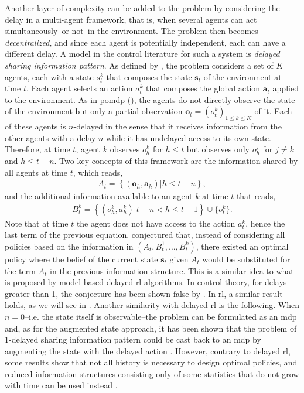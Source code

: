 Another layer of complexity can be added to the problem by considering the delay in a multi-agent framework, that is, when several agents can act simultaneously--or not--in the environment.
The problem then becomes \emph{decentralized}, and since each agent is potentially independent, each can have a different delay.
A model in the control literature for such a system is \emph{delayed sharing information pattern}.
As defined by \cite{witsenhausen1971separation}, the problem considers a set of $K$ agents, each with a state $s_t^k$ that composes the state $\boldsymbol s_t$ of the environment at time $t$.
Each agent selects an action $a_t^k$ that composes the global action $\boldsymbol a_t$ applied to the environment.
As in \gls{pomdp} (), the agents do not directly observe the state of the environment but only a partial observation $\boldsymbol o_t = (o_t^k)_{1\le k \le K}$ of it. 
Each of these agents is $n$-delayed in the sense that it receives information from the other agents with a delay $n$ while it has undelayed access to its own state.
Therefore, at time $t$, agent $k$ observes $o_{h}^k$ for $h\le t$ but observes only $o_{h}^j$ for $j\ne k$ and $h\le t-n$.
Two key concepts of this framework are the information shared by all agents at time $t$, which reads,
\begin{align*}
    A_t = \left\{ (\boldsymbol o_h, \boldsymbol a_h)\vert h\le t-n \right\},
\end{align*}
and the additional information available to an agent $k$ at time $t$ that reads,
\begin{align*}
    B_t^k = \left\{ ( o_h^k,  a_h^k)\vert t-n<h\le t-1 \right\} \cup \{ o_t^k\}.
\end{align*}
Note that at time $t$ the agent does not have access to the action $ a_t^k$, hence the last term of the previous equation.
\cite{witsenhausen1971separation} conjectured that, instead of considering all policies based on the information in $(A_t,B_t^1,\dots,B_t^k)$, there existed an optimal policy where the belief of the current state $\boldsymbol s_t$ given $A_t$ would be substituted for the term $A_t$ in the previous information structure. 
This is a similar idea to what is proposed by model-based delayed \gls{rl} algorithms. 
In control theory, for delays greater than 1, the conjecture has been shown false by \cite{varaiya1978delayed}.
In \gls{rl}, a similar result holds, as we will see in .
Another similarity with delayed \gls{rl} is the following.
When $n=0$--i.e. the state itself is observable--the problem can be formulated as an \gls{mdp} and, as for the augmented state approach, it has been shown that the problem of 1-delayed sharing information pattern could be cast back to an \gls{mdp} by augmenting the state with the delayed action \cite{hsu1982decentralized}.
However, contrary to delayed \gls{rl}, some results show that not all history is necessary to design optimal policies, and reduced information structures consisting only of some statistics that do not grow with time can be used instead \cite{altman2009stochastic,nayyar2010optimal}.

